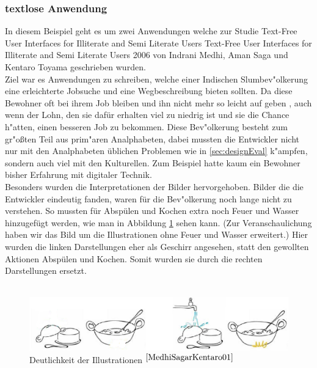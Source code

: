 \newpage
\subsubsection{textlose Anwendung}\label{sec:beisp3}
In diesem Beispiel geht es um zwei Anwendungen welche zur Studie \glqq Text-Free User Interfaces for Illiterate and Semi Literate Users \grqq
{}
					{Text-Free User Interfaces for Illiterate and Semi Literate Users}
					{2006}
					{}
 von Indrani Medhi, Aman Saga und Kentaro Toyama geschrieben wurden.\\
Ziel war es Anwendungen zu schreiben, welche einer Indischen Slumbev"olkerung eine erleichterte Jobsuche und eine Wegbeschreibung bieten sollten. Da diese Bewohner oft bei ihrem Job bleiben und ihn nicht mehr so leicht auf geben , auch wenn der Lohn, den sie dafür erhalten viel zu niedrig ist und sie die Chance h"atten, einen besseren Job zu bekommen. Diese Bev"olkerung besteht zum gr"oßten Teil aus prim"aren Analphabeten, dabei mussten die Entwickler nicht nur mit den Analphabeten üblichen Problemen wie in \ref{sec:designEval} k"ampfen, sondern auch viel mit den Kulturellen. Zum Beispiel hatte kaum ein Bewohner bisher Erfahrung mit digitaler Technik.\\
Besonders wurden die Interpretationen der Bilder hervorgehoben. Bilder die die Entwickler eindeutig fanden, waren für die Bev"olkerung noch lange nicht zu verstehen. So mussten für Abspülen und Kochen extra noch Feuer und Wasser hinzugefügt werden, wie man in Abbildung \ref{fig:picfail} sehen kann. (Zur Veranschaulichung haben wir das Bild um die Illustrationen ohne Feuer und Wasser erweitert.) Hier wurden die linken Darstellungen eher als Geschirr angesehen, statt den gewollten Aktionen Abspülen und Kochen. Somit wurden sie durch die rechten Darstellungen ersetzt.\\\\

\begin{figure}[h]
	\centering
		\includegraphics[width=1.00\textwidth]{Daten/pic_fail2.PNG}
	\caption{Deutlichkeit der Illustrationen $^{\ref{MedhiSagarKentaro01}}$}
	\label{fig:picfail}
\end{figure}


